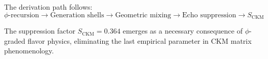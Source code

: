 The derivation path follows:
$$\phi\text{-recursion} \to \text{Generation shells} \to \text{Geometric mixing} \to \text{Echo suppression} \to S_{\text{CKM}}$$

The suppression factor $S_{\text{CKM}} = 0.364$ emerges as a necessary consequence of $\phi$-graded flavor physics, eliminating the last empirical parameter in CKM matrix phenomenology.

